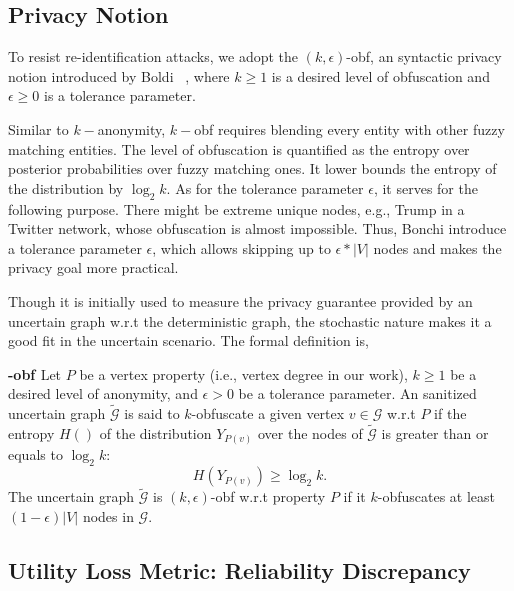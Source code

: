 \subsection{Privacy Notion}
\label{sec:privacyNotion}
To resist re-identification attacks, we adopt the $(k,\epsilon)$-obf, an syntactic privacy notion introduced by Boldi {\etal}~\cite{Boldi_Injecting_2012}, where $k \ge 1$ is a desired level of obfuscation  and $\epsilon \ge 0$ is a tolerance parameter. 

Similar to $k-$anonymity, $k-$obf requires blending every entity with other fuzzy matching entities. The level of obfuscation is quantified as the entropy over posterior probabilities over fuzzy matching ones. It lower bounds the entropy of the distribution by $\log_{2} k$. 
As for the tolerance parameter $\epsilon$, it serves for the following purpose. There might be extreme unique nodes, e.g., Trump in a Twitter network, whose obfuscation is almost impossible. Thus, Bonchi {\etal} introduce a tolerance parameter $\epsilon$, which allows skipping up to $\epsilon * |V|$ nodes and makes the privacy goal more practical. 


Though it is initially used to measure the privacy guarantee provided by an uncertain graph w.r.t the  deterministic graph, the stochastic nature makes it a good fit in the uncertain scenario. The formal definition is,
\theoremstyle{definition}
\begin{definition}
	\textbf{-obf \cite{Boldi_Injecting_2012}}
    Let $P$ be a vertex property (i.e., vertex degree in our work), $k \geq 1$ be a desired level of anonymity, and $\epsilon >0 $ be a tolerance parameter. 
    An sanitized uncertain graph $\tilde{\mathcal{G}}$ is said to $k$-obfuscate a given vertex $v \in \mathcal{G}$ w.r.t $P$ if the entropy $H()$ of the distribution $Y_{P(v)}$ over the nodes 
    of $\tilde{\mathcal{G}}$ is greater than or equals to $\log_{2}{k}$:
    \begin{equation*}
        H(Y_{P(v)}) \geq \log_{2}{k}.
    \label{obfCon}
    \end{equation*}
The uncertain graph $\tilde{\mathcal{G}}$
is $(k,\epsilon)$-obf w.r.t property $P$ 
if it $k$-obfuscates at least $(1-\epsilon)|V|$ nodes in $\mathcal{G}$. 
\label{def:obf}
\end{definition} 


\subsection{Utility Loss Metric: Reliability Discrepancy}

